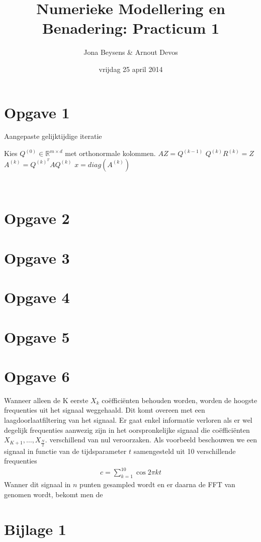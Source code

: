 \documentclass[a4paper]{article}
\title{Numerieke Modellering en Benadering: Practicum 1}
\author{Jona Beysens \& Arnout Devos}
\date{vrijdag 25 april 2014}
\newcommand{\opgave}[1]{\section*{Opgave #1}}
\begin{document}
\maketitle

\opgave{1}

\begin{algorithm}
 
 \caption{Aangepaste gelijktijdige iteratie}
\begin{algorithmic}[1]
\State Kies $Q^{(0)} \in \mathbb{R}^{m\times d}$ met orthonormale kolommen.
    \State $AZ=Q^{(k-1)}$
    \State $Q^{(k)}R^{(k)}=Z$
    \State $A^{(k)}=Q^{(k)^{T}}AQ^{(k)}$
\EndFor
\State $x = diag(A^{(k)})$
\end{algorithmic}
\label{alg:alg1}
\end{algorithm}
\ \\
\opgave{2}
\opgave{3}
\opgave{4}
\opgave{5}
\opgave{6}
Wanneer alleen de K eerste $X_k$ co\"{e}ffici\"{e}nten behouden worden, worden de hoogste frequenties uit het signaal weggehaald. Dit komt overeen met een laagdoorlaatfiltering van het signaal. Er gaat enkel informatie verloren als er wel degelijk frequenties aanwezig zijn in het oorspronkelijke signaal die co\"{e}ffici\"{e}nten $X_{K+1}, \dots ,X_{\frac{N}{2}}$. verschillend van nul veroorzaken.
Als voorbeeld beschouwen we een signaal in functie van de tijdsparameter $t$ samengesteld uit 10 verschillende frequenties
\begin{align}
c=\sum_{k=1}^{10} \cos{2\pi kt}
\end{align}
Wanner dit signaal in $n$ punten gesampled wordt en er daarna de FFT van genomen wordt, bekomt men de  
\section*{Bijlage 1} 

\label{bijlage1}
\end{document}
